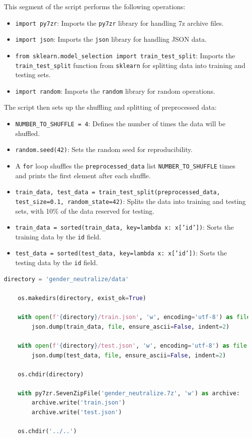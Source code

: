 \documentclass{solutionclass} %
\begin{document}
\begin{solution}
This segment of the script performs the following operations:

\begin{itemize}
	\item \texttt{import py7zr}: Imports the \texttt{py7zr} library for handling 7z archive files.
	\item \texttt{import json}: Imports the \texttt{json} library for handling JSON data.
	\item \texttt{from sklearn.model\_selection import train\_test\_split}: Imports the \texttt{train\_test\_split} function from \texttt{sklearn} for splitting data into training and testing sets.
	\item \texttt{import random}: Imports the \texttt{random} library for random operations.
\end{itemize}


The script then sets up the shuffling and splitting of preprocessed data:

\begin{itemize}
	\item \texttt{NUMBER\_TO\_SHUFFLE = 4}: Defines the number of times the data will be shuffled.
	\item \texttt{random.seed(42)}: Sets the random seed for reproducibility.
	\item A \texttt{for} loop shuffles the \texttt{preprocessed\_data} list \texttt{NUMBER\_TO\_SHUFFLE} times and prints the first element after each shuffle.
	\item \texttt{train\_data, test\_data = train\_test\_split(preprocessed\_data, test\_size=0.1, random\_state=42)}: Splits the data into training and testing sets, with 10\% of the data reserved for testing.
	\item \texttt{train\_data = sorted(train\_data, key=lambda x: x['id'])}: Sorts the training data by the \texttt{id} field.
	\item \texttt{test\_data = sorted(test\_data, key=lambda x: x['id'])}: Sorts the testing data by the \texttt{id} field.
\end{itemize}
\end{solution}



\begin{lstlisting}[language=Python]
	directory = 'gender_neutralize/data'
	
	os.makedirs(directory, exist_ok=True)
	
	with open(f'{directory}/train.json', 'w', encoding='utf-8') as file:
		json.dump(train_data, file, ensure_ascii=False, indent=2)
	
	with open(f'{directory}/test.json', 'w', encoding='utf-8') as file:
		json.dump(test_data, file, ensure_ascii=False, indent=2)
	
	os.chdir(directory)
	
	with py7zr.SevenZipFile('gender_neutralize.7z', 'w') as archive:
		archive.write('train.json')
		archive.write('test.json')
	
	os.chdir('../..')
	\end{lstlisting}
\end{document}
